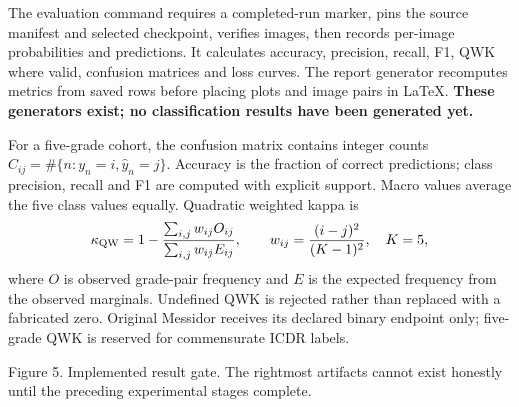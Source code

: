 \documentclass[10pt,a4paper]{article}
\newcommand{\smallhead}[1]{\vspace{5pt}{\color{teal}\bfseries #1}\par}
\begin{document}
The evaluation command requires a completed-run marker, pins the source
manifest and selected checkpoint, verifies images, then records per-image
probabilities and predictions. It calculates accuracy, precision, recall,
F1, QWK where valid, confusion matrices and loss curves. The report generator
recomputes metrics from saved rows before placing plots and image pairs in
LaTeX. \textbf{These generators exist; no classification results have been
generated yet.}

\smallhead{Declared metric definitions}
For a five-grade cohort, the confusion matrix contains integer counts
$C_{ij}=\#\{n:y_n=i,\hat y_n=j\}$. Accuracy is the fraction of correct
predictions; class precision, recall and F1 are computed with explicit
support. Macro values average the five class values equally. Quadratic
weighted kappa is
\[
\kappa_{\rm QW}=1-
\frac{\sum_{i,j}w_{ij}O_{ij}}{\sum_{i,j}w_{ij}E_{ij}},
\qquad
w_{ij}=\frac{(i-j)^2}{(K-1)^2},\quad K=5,
\]
where $O$ is observed grade-pair frequency and $E$ is the expected frequency
from the observed marginals. Undefined QWK is rejected rather than replaced
with a fabricated zero. Original Messidor receives its declared binary
endpoint only; five-grade QWK is reserved for commensurate ICDR labels.

\begin{center}

{\small\color{muted}Figure 5. Implemented result gate. The rightmost
artifacts cannot exist honestly until the preceding experimental stages
complete.}
\end{center}


\newpage
\end{document}
